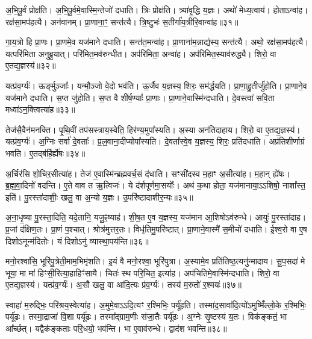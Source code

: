 अ॒भि॒पू॒र्वं प्रोक्ष॑ति। 
अ॒भि॒पू॒र्वमे॒वास्मि॒न्तेजो॑ दधाति। 
त्रिः प्रोक्ष॑ति। 
त्र्या॑वृ॒द्धि य॒ज्ञः। 
अथो॑ मेध्य॒त्वाय॑। 
होताऽन्वा॑ह। 
रक्ष॑सा॒मप॑हत्यै। 
अन॑वानम्। 
प्रा॒णाना॒ꣳ॒ सन्त॑त्यै। 
त्रि॒ष्टुभः॑ स॒तीर्गा॑य॒त्रीरि॒वान्वा॑ह॥३१॥

गा॒य॒त्रो हि प्रा॒णः। 
प्रा॒णमे॒व यज॑माने दधाति। 
सन्त॑त॒मन्वा॑ह। 
प्रा॒णाना॑म॒न्नाद्य॑स्य॒ सन्त॑त्यै। 
अथो॒ रक्ष॑सा॒मप॑हत्यै। 
यत्परि॑मिता अनुब्रू॒यात्। 
परि॑मित॒मव॑रुन्धीत। 
अप॑रिमिता॒ अन्वा॑ह। 
अप॑रिमित॒स्याव॑रुद्ध्यै। 
शिरो॒ वा ए॒तद्य॒ज्ञस्य॑॥३२॥

यत्प्र॑व॒र्ग्यः॑। 
ऊर्ङ्मुञ्जाः᳚। 
यन्मौ॒ञ्जो वे॒दो भव॑ति। 
ऊ॒र्जैव य॒ज्ञस्य॒ शिरः॒ सम॑र्द्धयति। 
प्रा॒णा॒हु॒तीर्जु॑होति। 
प्रा॒णाने॒व यज॑माने दधाति। 
स॒प्त जु॑होति। 
स॒प्त वै शी॑र्\mbox{}ष॒ण्याः᳚ प्रा॒णाः। 
प्रा॒णाने॒वास्मि॑न्दधाति। 
दे॒वस्त्वा॑ सवि॒ता मध्वा॑ऽन॒क्त्वित्या॑ह॥३३॥

तेज॑सै॒वैन॑मनक्ति। 
पृ॒थि॒वीं तप॑सस्त्राय॒स्वेति॒ हिर॑ण्य॒मुपा᳚स्यति। 
अ॒स्या अन॑तिदाहाय। 
शिरो॒ वा ए॒तद्य॒ज्ञस्य॑। 
यत्प्र॑व॒र्ग्यः॑। 
अ॒ग्निः सर्वा॑ दे॒वताः᳚। 
प्र॒ल॒वाना॒दीप्योपा᳚स्यति। 
दे॒वता᳚स्वे॒व य॒ज्ञस्य॒ शिरः॒ प्रति॑दधाति। 
अप्र॑तिशीर्णाग्रं भवति। 
ए॒तद्ब॑र्\mbox{}हि॒र्\mbox{}ह्ये॑षः॥३४॥

अ॒र्चिर॑सि शो॒चिर॒सीत्या॑ह। 
तेज॑ ए॒वास्मि॑न्ब्रह्मवर्च॒सं द॑धाति। 
सꣳसी॑दस्व म॒हाꣳ अ॒सीत्या॑ह। 
म॒हान् ह्ये॑षः। 
ब्र॒ह्म॒वा॒दिनो॑ वदन्ति। 
ए॒ते वाव त ऋ॒त्विजः॑। 
ये द॑र्\mbox{}शपूर्णमा॒सयोः᳚। 
अथ॑ क॒था होता॒ यज॑मानाया॒ऽऽशिषो॒ नाशा᳚स्त॒ इति॑। 
पु॒रस्ता॑दाशीः॒ खलु॒ वा अ॒न्यो य॒ज्ञः। 
उ॒परि॑ष्टादाशीर॒न्यः॥३५॥

अ॒ना॒धृ॒ष्या पु॒रस्ता॒दिति॒ यदे॒तानि॒ यजू॒ꣴ॒ष्याह॑। 
शी॒\ar{}\mbox{}ष॒त ए॒व य॒ज्ञस्य॒ यज॑मान आ॒शिषोऽव॑रुन्धे। 
आयुः॑ पु॒रस्ता॑दाह। 
प्र॒जां द॑क्षिण॒तः। 
प्रा॒णं प॒श्चात्। 
श्रोत्र॑मुत्तर॒तः। 
विधृ॑तिमु॒परि॑ष्टात्। 
प्रा॒णाने॒वास्मै॑ स॒मीचो॑ दधाति। 
ई॒श्व॒रो वा ए॒ष दिशोऽनून्म॑दितोः। 
यं दिशोऽनु॑ व्यास्था॒पय॑न्ति॥३६॥

मनो॒रश्वा॑सि॒ भूरि॑पु॒त्रेती॒माम॒भिमृ॑शति। 
इ॒यं वै मनो॒रश्वा॒ भूरि॑पुत्रा। 
अ॒स्यामे॒व प्रति॑तिष्ठ॒त्यनु॑न्मादाय। 
सू॒प॒सदा॑ मे भूया॒ मा मा॑ हिꣳसी॒रित्या॒हाहिꣳ॑सायै। 
चितः॑ स्थ परि॒चित॒ इत्या॑ह। 
अप॑चितिमे॒वास्मि॑न्दधाति। 
शिरो॒ वा ए॒तद्य॒ज्ञस्य॑। 
यत्प्र॑व॒र्ग्यः॑। 
अ॒सौ खलु॒ वा आ॑दि॒त्यः प्र॑व॒र्ग्यः॑। 
तस्य॑ म॒रुतो॑ र॒श्मयः॑॥३७॥

स्वाहा॑ म॒रुद्भिः॒ परि॑श्रय॒स्वेत्या॑ह। 
अ॒मुमे॒वाऽऽदि॒त्यꣳ र॒श्मिभिः॒ पर्यू॑हति। 
तस्मा॑द॒सावा॑दि॒त्यो॑ऽमुष्मिँ॑ल्लो॒के र॒श्मिभिः॒ पर्यू॑ढः। 
तस्मा॒द्राजा॑ वि॒शा पर्यू॑ढः। 
तस्मा᳚द्ग्राम॒णीः स॑जा॒तैः पर्यू॑ढः। 
अ॒ग्नेः सृ॒ष्टस्य॑ य॒तः। 
विक॑ङ्कतं॒ भा आ᳚र्च्छत्। 
यद्वैक॑ङ्कताः परि॒धयो॒ भव॑न्ति। 
भा ए॒वाव॑रुन्धे। 
द्वाद॑श भवन्ति॥३८॥

